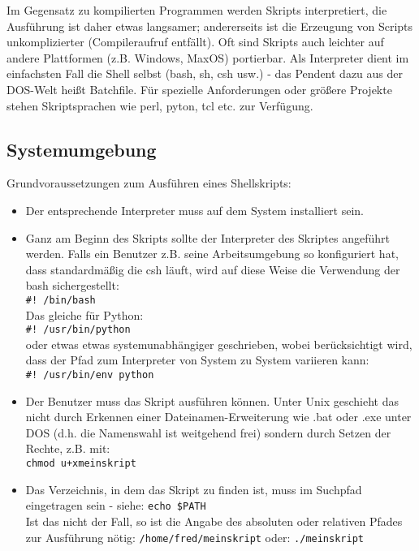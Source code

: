 \documentclass[11pt]{article}
\begin{document}
Im Gegensatz zu kompilierten Programmen werden Skripts interpretiert,
die Ausführung ist daher etwas langsamer; andererseits ist die
Erzeugung von Scripts unkomplizierter (Compileraufruf entfällt). Oft
sind Skripts auch leichter auf andere Plattformen (z.B. Windows,
MaxOS) portierbar. Als Interpreter dient im einfachsten Fall die Shell
selbst (bash, sh, csh usw.) - das Pendent dazu aus der DOS-Welt heißt
Batchfile. Für spezielle Anforderungen oder größere Projekte stehen
Skriptsprachen wie perl, pyton, tcl etc. zur Verfügung.

\subsection{Systemumgebung}
Grundvoraussetzungen zum Ausführen eines Shellskripts:
\begin{itemize}
\item Der entsprechende Interpreter muss auf dem System installiert sein.
\item Ganz am Beginn des Skripts sollte der Interpreter des Skriptes
  angeführt werden. Falls ein Benutzer z.B. seine Arbeitsumgebung so
  konfiguriert hat, dass standardmäßig die csh läuft, wird auf diese
  Weise die Verwendung der bash sichergestellt:\\
  \texttt{\#! /bin/bash}\\
  Das gleiche für Python: \\
  \texttt{\#! /usr/bin/python}\\
  oder etwas etwas systemunabhängiger geschrieben, wobei berücksichtigt wird, dass der Pfad zum Interpreter von   System zu System variieren kann: \\
  \texttt{\#! /usr/bin/env python}\\
\item Der Benutzer muss das Skript ausführen können. Unter Unix
  geschieht das nicht durch Erkennen einer Dateinamen-Erweiterung wie
  .bat oder .exe unter DOS (d.h. die Namenswahl ist weitgehend frei)
  sondern durch Setzen der Rechte, z.B. mit: \\
  \texttt{chmod u+xmeinskript}
\item Das Verzeichnis, in dem das Skript zu finden ist, muss im
  Suchpfad eingetragen sein - siehe: 
  \texttt{echo \$PATH}\\
  Ist das nicht der Fall, so ist die Angabe des absoluten oder
  relativen Pfades zur Ausführung nötig:
  \texttt{/home/fred/meinskript}
  oder:
  \texttt{./meinskript}
\end{itemize}
\end{document}
